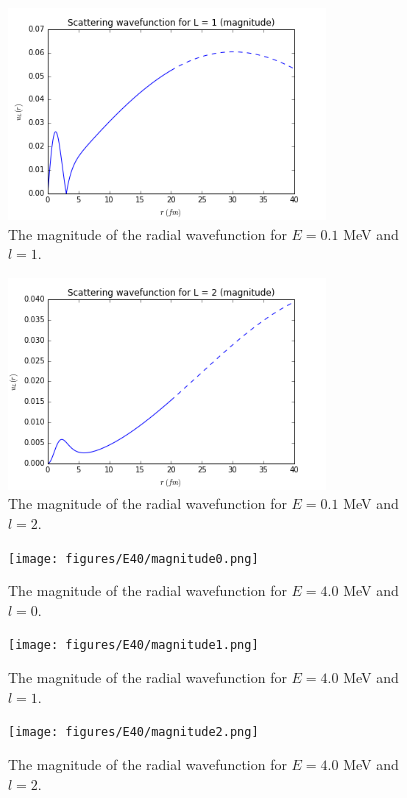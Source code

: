 \documentclass[]{scrartcl}
\begin{document}
\begin{figure}
\centering
	\includegraphics[width=0.75\textwidth]{figures/E01/magnitude1.png}
	\caption{The magnitude of the radial wavefunction for $E = 0.1$ MeV and $l=1$.}
	\label{fig:e01l1}
\end{figure}

\begin{figure}
\centering
	\includegraphics[width=0.75\textwidth]{figures/E01/magnitude2.png}
	\caption{The magnitude of the radial wavefunction for $E = 0.1$ MeV and $l=2$.}
	\label{fig:e01l2}
\end{figure}


\begin{figure}
\centering
	\texttt{[image: figures/E40/magnitude0.png]}
	\caption{The magnitude of the radial wavefunction for $E = 4.0$ MeV and $l=0$.}
	\label{fig:e01l0}
\end{figure}

\begin{figure}
\centering
	\texttt{[image: figures/E40/magnitude1.png]}
	\caption{The magnitude of the radial wavefunction for $E = 4.0$ MeV and $l=1$.}
	\label{fig:e01l1}
\end{figure}

\begin{figure}[h]
\centering
	\texttt{[image: figures/E40/magnitude2.png]}
	\caption{The magnitude of the radial wavefunction for $E = 4.0$ MeV and $l=2$.}
	\label{fig:e01l2}
\end{figure}
\end{document}
